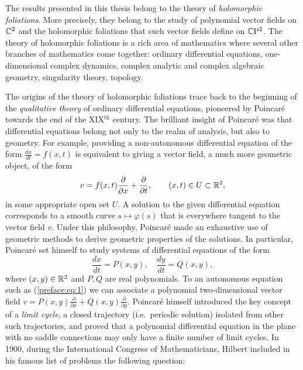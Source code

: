 \documentclass[phd,tocprelim]{cornell}
\begin{document}
The results presented in this thesis belong to the theory of \textit{holomorphic foliations}. More precisely, they belong to the study of polynomial vector fields on $\mathbb{C}^2$ and the holomorphic foliations that such vector fields define on $\mathbb{C}\mathrm{P}^2$. The theory of holomorphic foliations is a rich area of mathematics where several other branches of mathematics come together: ordinary differential equations, one-dimensional complex dynamics, complex analytic and complex algebraic geometry, singularity theory, topology. 

The origins of the theory of holomorphic foliations trace back to the beginning of the \textit{qualitative theory} of ordinary differential equations, pioneered by Poincar\'{e} towards the end of the XIX$^{\text{th}}$ century. 
%
%
The brilliant insight of Poincar\'{e} was that differential equations belong not only to the realm of analysis, but also to geometry. For example, providing a non-autonomous differential equation of the form $\displaystyle\frac{dx}{dt}=f(x,t)$ is equivalent to giving a vector field, a much more geometric object, of the form
 \[ v = f(x,t)\frac{\partial}{\partial x} + \frac{\partial}{\partial t}, \qquad (x,t)\in U\subset\mathbb{R}^2, \]
in some appropriate open set $U$. A solution to the given differential equation corresponds to a smooth curve $s\mapsto\varphi(s)$ that is everywhere tangent to the vector field $v$. Under this philosophy, Poincar\'{e} made an exhaustive use of geometric methods to derive geometric properties of the solutions. In particular, Poincar\'{e} set himself to study systems of differential equations of the form 
\begin{equation}\label{preface:eq:1}
 \frac{dx}{dt}=P(x,y), \quad \frac{dy}{dt}=Q(x,y),
\end{equation}
where $(x,y)\in\mathbb{R}^2$ and $P,Q$ are real polynomials. To an autonomous equation such as (\ref{preface:eq:1}) we can associate a polynomial two-dimensional vector field $\displaystyle v=P(x,y)\frac{\partial}{\partial x} + Q(x,y)\frac{\partial}{\partial y}$. Poincar\'{e} himself introduced the key concept of a \textit{limit cycle}, a closed trajectory (i.e.~periodic solution) isolated from other such trajectories, and proved that a polynomial differential equation in the plane with no saddle connections may only have a finite number of limit cycles. 
%
%
In 1900, during the International Congress of Mathematicians, Hilbert included in his famous list of problems the following question:
\end{document}
